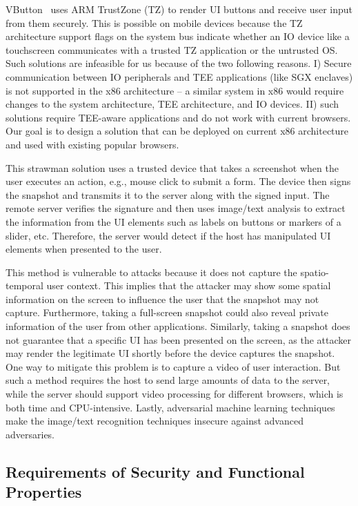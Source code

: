  VButton~\cite{li2018vbutton} uses ARM TrustZone (TZ) to render UI buttons and receive user input from them securely. This is possible on mobile devices because the TZ architecture support flags on the system bus indicate whether an IO device like a touchscreen communicates with a trusted TZ application or the untrusted OS. Such solutions are infeasible for us because of the two following reasons. I) Secure communication between IO peripherals and TEE applications (like SGX enclaves) is not supported in the x86 architecture -- a similar system in x86 would require changes to the system architecture, TEE architecture, and IO devices. II) such solutions require TEE-aware applications and do not work with current browsers. Our goal is to design a solution that can be deployed on current x86 architecture and used with existing popular browsers.

 This strawman solution uses a trusted device that takes a screenshot when the user executes an action, e.g., mouse click to submit a form. The device then signs the snapshot and transmits it to the server along with the signed input. The remote server verifies the signature and then uses image/text analysis to extract the information from the UI elements such as labels on buttons or markers of a slider, etc. Therefore, the server would detect if the host has manipulated UI elements when presented to the user.

This method is vulnerable to attacks because it does not capture the spatio-temporal user context. This implies that the attacker may show some spatial information on the screen to influence the user that the snapshot may not capture. Furthermore, taking a full-screen snapshot could also reveal private information of the user from other applications. Similarly, taking a snapshot does not guarantee that a specific UI has been presented on the screen, as the attacker may render the legitimate UI shortly before the device captures the snapshot.
One way to mitigate this problem is to capture a video of user interaction. But such a method requires the host to send large amounts of data to the server, while the server should support video processing for different browsers, which is both time and CPU-intensive. Lastly, adversarial machine learning techniques~\cite{eykholt2017robust,sitawarin2018rogue} make the image/text recognition techniques insecure against advanced adversaries.


\subsection{Requirements of Security and Functional Properties}
\label{sec:problemStatement:goals}

